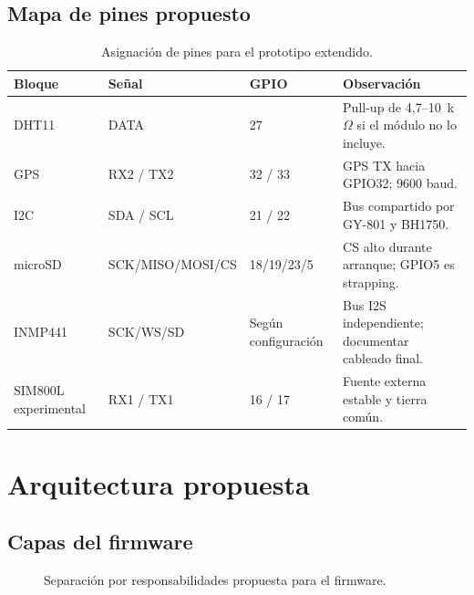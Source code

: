 \documentclass[11pt,a4paper,oneside]{report}
\begin{document}
\section{Mapa de pines propuesto}
\begin{table}[H]
\centering
\caption{Asignación de pines para el prototipo extendido.}
\begin{tabularx}{\textwidth}{@{}l l l Y@{}}
\toprule
\textbf{Bloque} & \textbf{Señal} & \textbf{GPIO} & \textbf{Observación}\\
\midrule
DHT11 & DATA & 27 & Pull-up de 4,7--10~k$\Omega$ si el módulo no lo incluye.\\
GPS & RX2 / TX2 & 32 / 33 & GPS TX hacia GPIO32; 9600 baud.\\
I2C & SDA / SCL & 21 / 22 & Bus compartido por GY-801 y BH1750.\\
microSD & SCK/MISO/MOSI/CS & 18/19/23/5 & CS alto durante arranque; GPIO5 es strapping.\\
INMP441 & SCK/WS/SD & Según configuración & Bus I2S independiente; documentar cableado final.\\
SIM800L experimental & RX1 / TX1 & 16 / 17 & Fuente externa estable y tierra común.\\
\bottomrule
\end{tabularx}
\end{table}

\chapter{Arquitectura propuesta}

\section{Capas del firmware}
\begin{figure}[H]
\centering
{}
\caption{Separación por responsabilidades propuesta para el firmware.}
\end{figure}
\end{document}
